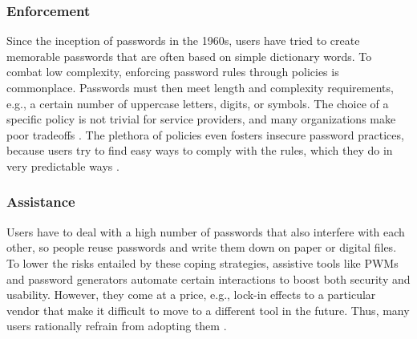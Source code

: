 \subsubsection{Enforcement}
Since the inception of passwords in the 1960s, users have tried to create memorable passwords that are often based on simple dictionary words. To combat low complexity, enforcing password rules through policies is commonplace. Passwords must then meet length and complexity requirements, e.g., a certain number of uppercase letters, digits, or symbols. The choice of a specific policy is not trivial for service providers, and many organizations make poor tradeoffs \cite{Florencio2010WhereDoPoliciesComeFrom, Shay2016DesigningPasswordPolicies}. The plethora of policies even fosters insecure password practices, because users try to find easy ways to comply with the rules, which they do in very predictable ways \cite{Inglesant2010TrueCostOfUnusablePolicies, Komanduri2011OfPasswordsAndPeople, Ur2015PWCreationLab}. 

\subsubsection{Assistance}
Users have to deal with a high number of passwords that also interfere with each other, so people reuse passwords and write them down on paper or digital files. To lower the risks entailed by these coping strategies, assistive tools like \glspl{PWM} and password generators automate certain interactions to boost both security and usability. However, they come at a price, e.g., lock-in effects to a particular vendor that make it difficult to move to a different tool in the future. Thus, many users rationally refrain from adopting them \cite{CSID2012PasswordHabits}. 

